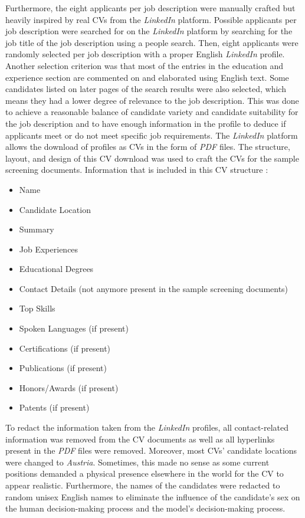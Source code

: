 \documentclass[draft,final]{thesisclass} %
\begin{document}
Furthermore, the eight applicants per job description were manually crafted but heavily inspired by real \acs{CV}s from the \textit{LinkedIn} platform.
Possible applicants per job description were searched for on the \textit{LinkedIn} platform by searching for the job title of the job description using a people search.
Then, eight applicants were randomly selected per job description with a proper English \textit{LinkedIn} profile. Another selection criterion was that most of the entries in the education and experience section are commented on and elaborated using English text.
Some candidates listed on later pages of the search results were also selected, which means they had a lower degree of relevance to the job description.
This was done to achieve a reasonable balance of candidate variety and candidate suitability for the job description and to have enough information in the profile to deduce if applicants meet or do not meet specific job requirements.
The \textit{LinkedIn} platform allows the download of profiles as \acs{CV}s in the form of \textit{PDF} files.
The structure, layout, and design of this \acs{CV} download was used to craft the \acs{CV}s for the sample screening documents.
Information that is included in this \acs{CV} structure \label{cv_structure}:
\begin{itemize}
    \item Name
    \item Candidate Location
    \item Summary
    \item Job Experiences
    \item Educational Degrees
    \item Contact Details (not anymore present in the sample screening documents)
    \item Top Skills
    \item Spoken Languages (if present)
    \item Certifications (if present)
    \item Publications (if present)
    \item Honors/Awards (if present)
    \item Patents (if present)
\end{itemize}
To redact the information taken from the \textit{LinkedIn} profiles, all contact-related information was removed from the \acs{CV} documents as well as all hyperlinks present in the \textit{PDF} files were removed.
Moreover, most \acs{CV}s’ candidate locations were changed to \textit{Austria}. Sometimes, this made no sense as some current positions demanded a physical presence elsewhere in the world for the \acs{CV} to appear realistic.
Furthermore, the names of the candidates were redacted to random unisex English names to eliminate the influence of the candidate's sex on the human decision-making process and the model's decision-making process.
\end{document}
